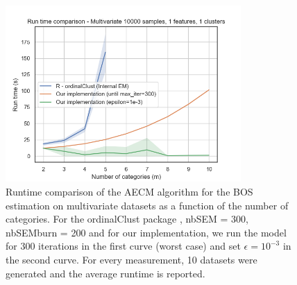 \begin{figure}[H]
    \centering
    \includegraphics[width=0.8\textwidth]{python_figures/run_time_comparison_multivariate_epsilon.png}
    \caption{Runtime comparison of the AECM algorithm for the BOS estimation on multivariate datasets as a function of the number of categories. For the ordinalClust package \cite{selosse2021ordinalclust}, nbSEM = 300, nbSEMburn = 200 and for our implementation, we run the model for $300$ iterations in the first curve (worst case) and set $\epsilon = 10^{-3}$ in the second curve. For every measurement, 10 datasets were generated and the average runtime is reported.}
\end{figure}


